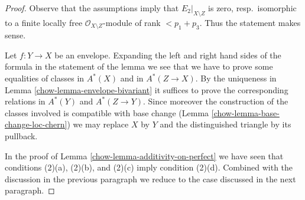 \begin{proof}

Observe that the assumptions imply that $E_2|_{X \setminus Z}$ is zero,
resp.\ isomorphic to a finite locally free $\mathcal{O}_{X \setminus Z}$-module
of rank $< p_1 + p_3$. Thus the statement makes sense.

\medskip\noindent
Let $f : Y \to X$ be an envelope. Expanding the left and right hand sides
of the formula in the statement of the lemma we see that we have to prove
some equalities of classes in $A^*(X)$ and in $A^*(Z \to X)$. By the
uniqueness in Lemma \ref{chow-lemma-envelope-bivariant} it suffices to prove the
corresponding relations in $A^*(Y)$ and $A^*(Z \to Y)$. Since moreover
the construction of the classes involved is compatible with base change
(Lemma \ref{chow-lemma-base-change-loc-chern}) we may replace $X$ by $Y$
and the distinguished triangle by its pullback.

\medskip\noindent
In the proof of Lemma \ref{chow-lemma-additivity-on-perfect} we have
seen that conditions (2)(a), (2)(b), and (2)(c) imply condition
(2)(d). Combined with the discussion in the previous paragraph we
reduce to the case discussed in the next paragraph.


\end{proof}
